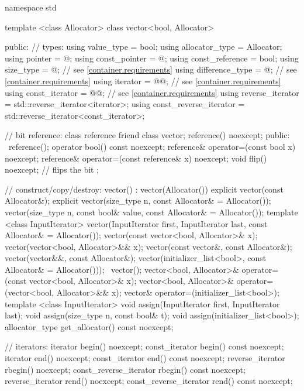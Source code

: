 \begin{codeblock}
namespace std {
  template <class Allocator>
  class vector<bool, Allocator> {
  public:
    // types:
    using value_type             = bool;
    using allocator_type         = Allocator;
    using pointer                = @\impdef@;
    using const_pointer          = @\impdef@;
    using const_reference        = bool;
    using size_type              = @\impdef@; // see \ref{container.requirements}
    using difference_type        = @\impdef@; // see \ref{container.requirements}
    using iterator               = @@; // see \ref{container.requirements}
    using const_iterator         = @@; // see \ref{container.requirements}
    using reverse_iterator       = std::reverse_iterator<iterator>;
    using const_reverse_iterator = std::reverse_iterator<const_iterator>;

    // bit reference:
    class reference {
      friend class vector;
      reference() noexcept;
    public:
      ~reference();
      operator bool() const noexcept;
      reference& operator=(const bool x) noexcept;
      reference& operator=(const reference& x) noexcept;
      void flip() noexcept;     // flips the bit
    };

    // construct/copy/destroy:
    vector() : vector(Allocator()) { }
    explicit vector(const Allocator&);
    explicit vector(size_type n, const Allocator& = Allocator());
    vector(size_type n, const bool& value,
           const Allocator& = Allocator());
    template <class InputIterator>
      vector(InputIterator first, InputIterator last,
             const Allocator& = Allocator());
    vector(const vector<bool, Allocator>& x);
    vector(vector<bool, Allocator>&& x);
    vector(const vector&, const Allocator&);
    vector(vector&&, const Allocator&);
    vector(initializer_list<bool>, const Allocator& = Allocator()));
   ~vector();
    vector<bool, Allocator>& operator=(const vector<bool, Allocator>& x);
    vector<bool, Allocator>& operator=(vector<bool, Allocator>&& x);
    vector& operator=(initializer_list<bool>);
    template <class InputIterator>
      void assign(InputIterator first, InputIterator last);
    void assign(size_type n, const bool& t);
    void assign(initializer_list<bool>);
    allocator_type get_allocator() const noexcept;

    // iterators:
    iterator               begin() noexcept;
    const_iterator         begin() const noexcept;
    iterator               end() noexcept;
    const_iterator         end() const noexcept;
    reverse_iterator       rbegin() noexcept;
    const_reverse_iterator rbegin() const noexcept;
    reverse_iterator       rend() noexcept;
    const_reverse_iterator rend() const noexcept;

}}
\end{codeblock}
